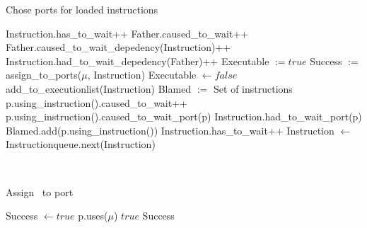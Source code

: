\begin{algorithm}[H]
    \SetAlgoLined
    \caption{Chose ports for loaded instructions}
     {
         {
            Instruction.has\_to\_wait++\;
             {
                Father.caused\_to\_wait++\;
                Father.caused\_to\_wait\_depedency(Instruction)++\;
                Instruction.had\_to\_wait\_depedency(Father)++\;
            }
        } {
            Executable $:= true$\;
             {
                Success $:=$ assign\_to\_ports($\mu$, Instruction)\;
                 {
                    Executable $\leftarrow false$\;
                }
            }
             {
                add\_to\_executionlist(Instruction)\; \label{line:if}
            }{
                Blamed $:=$ Set of instructions\; \label{line:else}
                 {
                     {
                        p.using\_instruction().caused\_to\_wait++\;
                        p.using\_instruction().caused\_to\_wait\_port(p)\;
                        Instruction.had\_to\_wait\_port(p)\;
                        Blamed.add(p.using\_instruction())\;
                    }
                }
                Instruction.has\_to\_wait++\;
            }          
        }
        Instruction $\leftarrow$ Instructionqueue.next(Instruction)\;
    }
\end{algorithm}

~\\[-1em]
\begin{algorithm}[H]
    \label{alg:assign}
    \SetAlgoLined
    \caption{Assign \microop\ to port}
    Success $\leftarrow true$\;
     {
         {
            p.uses($\mu$)\;
            \Return $true$\;
        }
    }
    \Return Success\;
\end{algorithm}

